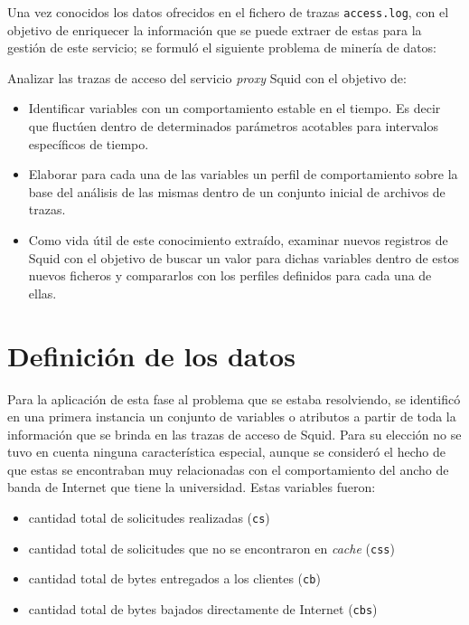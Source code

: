 Una vez conocidos los datos ofrecidos en el fichero de trazas
\texttt{access.log}, con el objetivo de enriquecer la información que se puede
extraer de estas para la gestión de este servicio; se formuló el siguiente
problema de minería de datos:

  Analizar las trazas de acceso del servicio \textit{proxy} Squid con el
  objetivo de:
  \begin{itemize}
    \item Identificar variables con un comportamiento estable en el tiempo. Es
     decir que fluctúen dentro de determinados parámetros acotables para 
     intervalos específicos de tiempo.
    \item Elaborar para cada una de las variables un perfil de comportamiento
     sobre la base del análisis de las mismas dentro de un conjunto inicial de
     archivos de trazas.
    \item Como vida útil de este conocimiento extraído, examinar nuevos
     registros de Squid con el objetivo de buscar un valor para dichas variables
     dentro de estos nuevos ficheros y compararlos con los perfiles definidos 
     para cada una de ellas.
  \end{itemize}

\section{Definición de los datos}
\label{sec:data_definition}
Para la aplicación de esta fase al problema que se estaba resolviendo, se
identificó en una primera instancia un conjunto de variables o atributos a
partir de toda la información que se brinda en las trazas de acceso de Squid.
Para su elección no se tuvo en cuenta ninguna característica especial, aunque 
se consideró el hecho de que estas se encontraban muy relacionadas con el
comportamiento del ancho de banda de Internet que tiene la universidad. Estas
variables fueron:
\begin{itemize}
 \item cantidad total de solicitudes realizadas (\texttt{cs})
 \item cantidad total de solicitudes que no se encontraron en \textit{cache} 
  (\texttt{css})
 \item cantidad total de bytes entregados a los clientes (\texttt{cb})
 \item cantidad total de bytes bajados directamente de Internet (\texttt{cbs})
\end{itemize}

